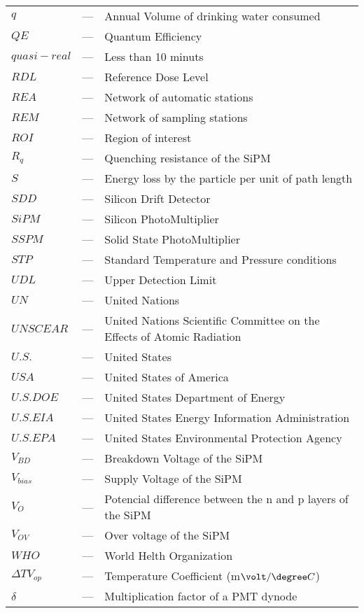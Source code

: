 \begin{longtable}{p{25mm} c p{120mm} }
$q$ & --- & Annual Volume of drinking water consumed\\
$QE$ & --- & Quantum Efficiency\\
$quasi-real$ & --- & Less than 10 minuts\\
$RDL$ & --- & Reference Dose Level\\
$REA$ & --- & Network of automatic stations\\
$REM$ & --- & Network of sampling stations\\
$ROI$ & --- & Region of interest\\
$R_q$ & --- & Quenching resistance of the SiPM\\
$S$ & --- & Energy loss by the particle per unit of path length\\
$SDD$ & --- & Silicon Drift Detector\\
$SiPM$ & --- & Silicon PhotoMultiplier\\
$SSPM$ & --- & Solid State PhotoMultiplier\\
$STP$ & --- & Standard Temperature and Pressure conditions\\
$UDL$ & --- & Upper Detection Limit\\
$UN$ & --- & United Nations\\
$UNSCEAR$ & --- & United Nations Scientific Committee on the Effects
\newline
of Atomic Radiation\\
$U.S.$ & --- & United States\\
$USA$ & --- & United States of America\\
$U.S. DOE$ & --- & United States Department of Energy\\
$U.S. EIA$ & --- & United States Energy Information Administration\\
$U.S. EPA$ & --- & United States Environmental Protection Agency\\
$V_{BD}$ & --- & Breakdown Voltage of the SiPM\\
$V_{bias}$ & --- & Supply Voltage of the SiPM\\
$V_{O}$ & --- & Potencial difference between the n and p layers of 
\newline
the SiPM\\
$V_{OV}$ & --- & Over voltage of the SiPM\\
$WHO$ & --- & World Helth Organization\\
$\Delta TV_{op}$ & --- & Temperature Coefficient (m$\volt/\degree C$)\\
$\delta$ & --- & Multiplication factor of a PMT dynode\\


\end{longtable}
